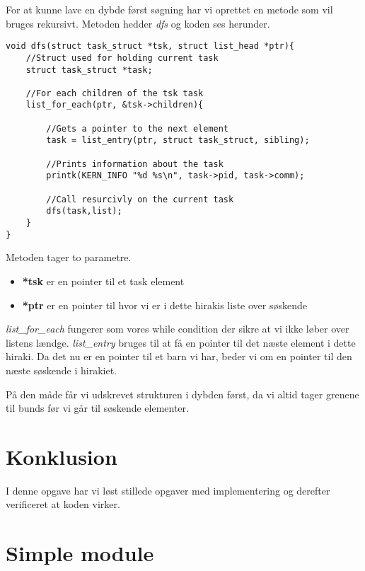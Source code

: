 \documentclass[danish]{report}
\begin{document}
For at kunne lave en dybde først søgning har vi oprettet en metode som vil bruges rekursivt. Metoden hedder \textit{dfs} og koden ses herunder.

\begin{lstlisting}
void dfs(struct task_struct *tsk, struct list_head *ptr){
	//Struct used for holding current task
	struct task_struct *task;
	
	//For each children of the tsk task
	list_for_each(ptr, &tsk->children){ 
	
		//Gets a pointer to the next element
		task = list_entry(ptr, struct task_struct, sibling); 
		
		//Prints information about the task
		printk(KERN_INFO "%d %s\n", task->pid, task->comm);
		
		//Call resurcivly on the current task
		dfs(task,list);
	}
}
\end{lstlisting}

Metoden tager to parametre.

\begin{itemize}
	\item \textbf{*tsk} er en pointer til et task element
	\item \textbf{*ptr} er en pointer til hvor vi er i dette hirakis liste over søskende
\end{itemize}

\textit{list\_for\_each} fungerer som vores while condition der sikre at vi ikke løber over listens lændge. \textit{list\_entry} bruges til at få en pointer til det næste element i dette hiraki. Da det nu er en pointer til et barn vi har, beder vi om en pointer til den næste søskende i hirakiet.

På den måde får vi udskrevet strukturen i dybden først, da vi altid tager grenene til bunds før vi går til søskende elementer.

\chapter{Konklusion}
I denne opgave har vi løst stillede opgaver med implementering og derefter verificeret at koden virker.
\endgroup
\appendix
\chapter{Simple module}
\label{simple.c}
\end{document}
